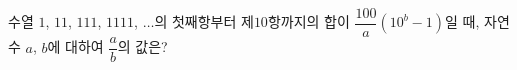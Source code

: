 수열 $1$, $11$, $111$, $1111$, $\ldots$의 첫째항부터 제$10$항까지의 합이 $\dfrac{100}{a}(10^b-1)$일 때, 자연수 $a$, $b$에 대하여 $\dfrac{a}{b}$의 값은?
